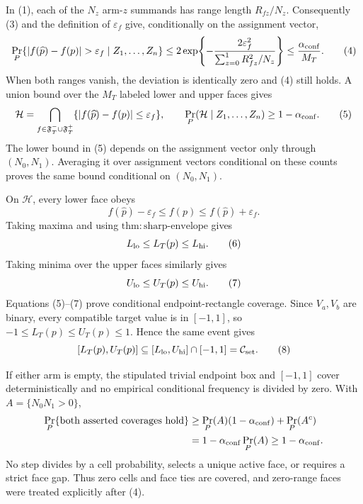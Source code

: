 In (1), each of the \(N_z\) arm-\(z\) summands has range length
\(R_{fz}/N_z\).  Consequently (3) and the definition of \(\varepsilon_f\)
give, conditionally on the assignment vector,
\[
 \Pr_P\{|f(\widehat p)-f(p)|>\varepsilon_f\mid Z_1,\ldots,Z_n\}
 \le
 2\exp\!\left\{-\frac{2\varepsilon_f^2}
 {\sum_{z=0}^1R_{fz}^2/N_z}\right\}
 \le\frac{\alpha_{\rm conf}}{M_T}. \tag{4}
\]
When both ranges vanish, the deviation is identically zero and (4) still
holds.  A union bound over the \(M_T\) labeled lower and upper faces gives
\[
 \mathcal H=
 \bigcap_{f\in\mathfrak F^-_T\cup\mathfrak F^+_T}
 \{|f(\widehat p)-f(p)|\le\varepsilon_f\},
 \qquad
 \Pr_P(\mathcal H\mid Z_1,\ldots,Z_n)\ge1-\alpha_{\rm conf}. \tag{5}
\]
The lower bound in (5) depends on the assignment vector only through
\((N_0,N_1)\).  Averaging it over assignment vectors conditional on these
counts proves the same bound conditional on \((N_0,N_1)\).

On \(\mathcal H\), every lower face obeys
\[
 f(\widehat p)-\varepsilon_f\le f(p)
 \le f(\widehat p)+\varepsilon_f.
\]
Taking maxima and using \(\mathrm{thm{:}sharp\mbox{-}envelope}\) gives
\[
 L_{\rm lo}\le L_T(p)\le L_{\rm hi}. \tag{6}
\]
Taking minima over the upper faces similarly gives
\[
 U_{\rm lo}\le U_T(p)\le U_{\rm hi}. \tag{7}
\]
Equations (5)--(7) prove conditional endpoint-rectangle coverage.  Since
\(V_a,V_b\) are binary, every compatible target value is in \([-1,1]\), so
\(-1\le L_T(p)\le U_T(p)\le1\).  Hence the same event gives
\[
 [L_T(p),U_T(p)]
 \subseteq[L_{\rm lo},U_{\rm hi}]\cap[-1,1]
 =\mathcal C_{\rm set}. \tag{8}
\]

If either arm is empty, the stipulated trivial endpoint box and
\([-1,1]\) cover deterministically and no empirical conditional frequency
is divided by zero.  With \(A=\{N_0N_1>0\}\),
\[
\begin{aligned}
 \Pr_P\{\text{both asserted coverages hold}\}
 &\ge \Pr_P(A)(1-\alpha_{\rm conf})+\Pr_P(A^c)\\
 &=1-\alpha_{\rm conf}\Pr_P(A)\ge1-\alpha_{\rm conf}.
\end{aligned}
\]
No step divides by a cell probability, selects a unique active face, or
requires a strict face gap.  Thus zero cells and face ties are covered, and
zero-range faces were treated explicitly after (4).

